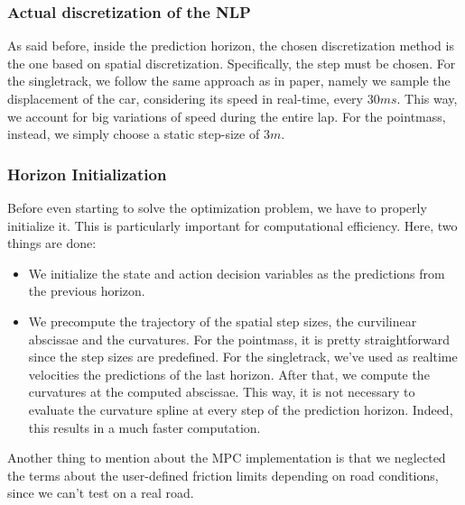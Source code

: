 \documentclass[a4paper, onecolumn, 11pt]{article}
\begin{document}
\subsubsection*{Actual discretization of the NLP}
As said before, inside the prediction horizon, the chosen discretization method
is the one based on spatial discretization. Specifically, the step must be
chosen. For the singletrack, we follow the same approach as in paper, namely
we sample the displacement of the car, considering its speed in real-time,
every $30ms$. This way, we account for big variations of speed during the
entire lap. For the pointmass, instead, we simply choose a static step-size
of $3m$.
\subsubsection*{Horizon Initialization}
Before even starting to solve the optimization problem, we have to properly
initialize it. This is particularly important for computational efficiency.
Here, two things are done:
\begin{itemize}
    \item We initialize the state and action decision variables as the
    predictions from the previous horizon.
    \item We precompute the trajectory of the spatial step sizes, the
    curvilinear abscissae and the curvatures. For the pointmass, it is
    pretty straightforward since the step sizes are predefined. For the
    singletrack, we've used as realtime velocities the predictions of the
    last horizon. After that, we compute the curvatures at the computed
    abscissae. This way, it is not necessary to evaluate the curvature
    spline at every step of the prediction horizon. Indeed, this results in
    a much faster computation.
\end{itemize}
Another thing to mention about the MPC implementation is that we neglected the
terms about the user-defined friction limits depending on road conditions, since
we can't test on a real road. 
\end{document}
